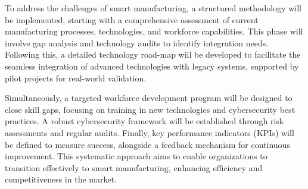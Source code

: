 To address the challenges of smart manufacturing, a structured methodology will be implemented, starting with a comprehensive assessment of current manufacturing processes, technologies, and workforce capabilities. This phase will involve gap analysis and technology audits to identify integration needs. Following this, a detailed technology road-map will be developed to facilitate the seamless integration of advanced technologies with legacy systems, supported by pilot projects for real-world validation.

Simultaneously, a targeted workforce development program will be designed to close skill gaps, focusing on training in new technologies and cybersecurity best practices. A robust cybersecurity framework will be established through risk assessments and regular audits. Finally, key performance indicators (KPIs) will be defined to measure success, alongside a feedback mechanism for continuous improvement. This systematic approach aims to enable organizations to transition effectively to smart manufacturing, enhancing efficiency and competitiveness in the market.